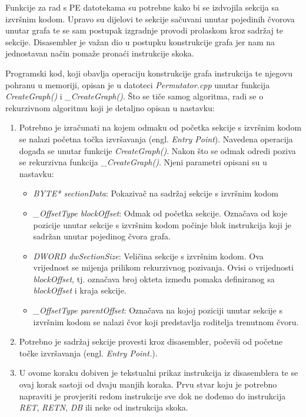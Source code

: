 \documentclass[times, utf8, diplomski, numeric]{fer}
\begin{document}
Funkcije za rad s PE datotekama su potrebne kako bi se izdvojila sekcija sa izvršnim kodom. Upravo su dijelovi te sekcije sačuvani unutar pojedinih čvorova unutar grafa te se sam postupak izgradnje provodi prolaskom kroz sadržaj te sekcije. Disasembler je važan dio u postupku konstrukcije grafa jer nam na jednostavan način pomaže pronaći instrukcije skoka.

Programski kod, koji obavlja operaciju konstrukcije grafa instrukcija te njegovu pohranu u memoriji, opisan je u datoteci \emph{Permutator.cpp} unutar funkcija \emph{CreateGraph()} i \emph{\_CreateGraph()}. Što se tiče samog algoritma, radi se o rekurzivnom algoritmu koji je detaljno opisan u nastavku:
\begin{enumerate}
\item Potrebno je izračunati na kojem odmaku od početka sekcije s izvršnim kodom se nalazi početna točka izvršavanja (engl. \emph{Entry Point}). Navedena operacija događa se unutar funkcije \emph{CreateGraph()}. Nakon što se odmak odredi poziva se rekurzivna funkcija \emph{\_CreateGraph()}. Njeni parametri opisani su u nastavku:
\begin{itemize}
\item \emph{BYTE* sectionData}: Pokazivač na sadržaj sekcije s izvršnim kodom
\item \emph{\_OffsetType blockOffset}: Odmak od početka sekcije. Označava od koje pozicije unutar sekcije s izvršnim kodom počinje blok instrukcija koji je sadržan unutar pojedinog čvora grafa.
\item \emph{DWORD dwSectionSize}: Veličina sekcije s izvršnim kodom. Ova vrijednost se mijenja prilikom rekurzivnog pozivanja. Ovisi o vrijednosti \emph{blockOffset}, tj. označava broj okteta između pomaka definiranog sa \emph{blockOffset} i kraja sekcije.
\item \emph{\_OffsetType parentOffset}: Označava na kojoj poziciji unutar sekcije s izvršnim kodom se nalazi čvor koji predstavlja roditelja trenutnom čvoru.
\end{itemize} 
\item Potrebno je sadržaj sekcije provesti kroz disasembler, počevši od početne točke izvršavanja (engl. \emph{Entry Point.}).
\item U ovome koraku dobiven je tekstualni prikaz instrukcija iz disasemblera te se ovaj korak sastoji od dvaju manjih koraka. Prvu stvar koju je potrebno napraviti je provjeriti redom instrukcije sve dok ne dođemo do instrukcija \emph{RET}, \emph{RETN}, \emph{DB} ili neke od instrukcija skoka.
\begin{enumerate}

\end{enumerate}
\end{enumerate}
\end{document}

